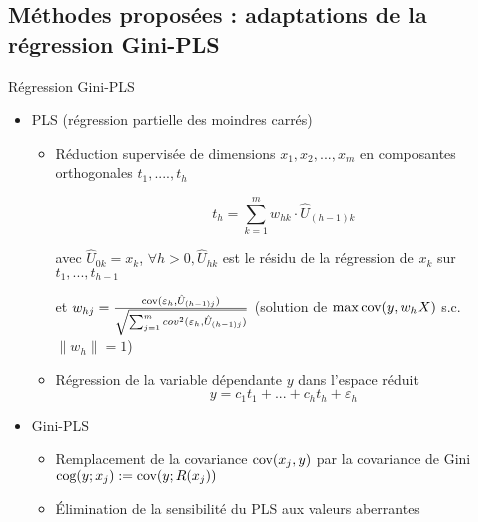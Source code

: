 \subsection{Méthodes proposées : adaptations de la régression Gini-PLS}

\begin{frame}[t]{\mysubsectiontitle}
Régression Gini-PLS
\begin{itemize}\small
	\item PLS \cite{wold1966pls} (régression partielle des moindres carrés) 
	\begin{itemize}\scriptsize
		\item Réduction supervisée de dimensions $x_1, x_2, ..., x_m$ en composantes orthogonales $t_1, ...., t_h$
		
		\[t_h = \sum_{k=1}^m w_{hk}\cdot \hat{U}_{(h-1)k}\] 
		
		avec $\hat{U}_{0k} = x_{k}$, $\forall h > 0, \hat{U}_{hk}$ est le résidu de la régression de $x_k$ sur $t_1, ..., t_{h-1}$ 
		
		et $w_{hj} = \frac{\text{cov}(\varepsilon_h, \hat{U}_{(h-1)j})}{\sqrt{\sum_{j=1}^m cov^2(\varepsilon_h, \hat{U}_{(h-1)j})}}$ (solution de $\mathop{\mathrm{max}}\limits \text{cov}(y,w_hX)$ s.c. $\| w_h\|=1$)
		\item Régression de la variable dépendante $y$ dans l'espace réduit
		\[y=c_1 t_1 + ... + c_h t_h + \varepsilon_h\]			
	\end{itemize}
	\item Gini-PLS  \cite{mussard2018ginipls}
	\begin{itemize} \scriptsize
		\item Remplacement de la covariance $\text{cov}(x_j, y)$ par la covariance de Gini $\text{cog}(y; x_j) := \text{cov}(y; R(x_j))$
		\item Élimination de la sensibilité du PLS aux valeurs aberrantes
	\end{itemize}	 	
	
\end{itemize} 
\end{frame}

